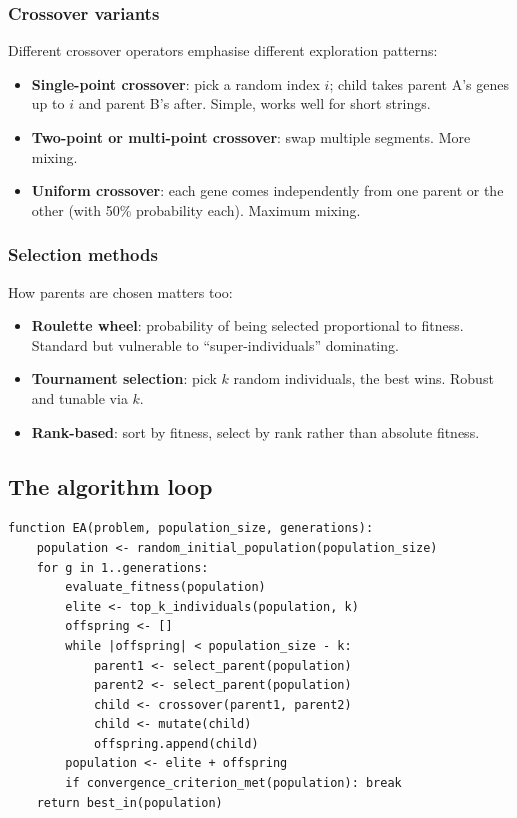 \documentclass[11pt, a4paper]{article}
\begin{document}
\subsubsection*{Crossover variants}

Different crossover operators emphasise different exploration patterns:

\begin{itemize}
  \item \textbf{Single-point crossover}: pick a random index $i$; child takes parent A's genes up to $i$ and parent B's after. Simple, works well for short strings.
  \item \textbf{Two-point or multi-point crossover}: swap multiple segments. More mixing.
  \item \textbf{Uniform crossover}: each gene comes independently from one parent or the other (with 50\% probability each). Maximum mixing.
\end{itemize}

\subsubsection*{Selection methods}

How parents are chosen matters too:

\begin{itemize}
  \item \textbf{Roulette wheel}: probability of being selected proportional to fitness. Standard but vulnerable to ``super-individuals'' dominating.
  \item \textbf{Tournament selection}: pick $k$ random individuals, the best wins. Robust and tunable via $k$.
  \item \textbf{Rank-based}: sort by fitness, select by rank rather than absolute fitness.
\end{itemize}

\subsection{The algorithm loop}

\begin{exbox}[EA pseudocode]
\begin{verbatim}
function EA(problem, population_size, generations):
    population <- random_initial_population(population_size)
    for g in 1..generations:
        evaluate_fitness(population)
        elite <- top_k_individuals(population, k)
        offspring <- []
        while |offspring| < population_size - k:
            parent1 <- select_parent(population)
            parent2 <- select_parent(population)
            child <- crossover(parent1, parent2)
            child <- mutate(child)
            offspring.append(child)
        population <- elite + offspring
        if convergence_criterion_met(population): break
    return best_in(population)
\end{verbatim}
\end{exbox}
\end{document}
